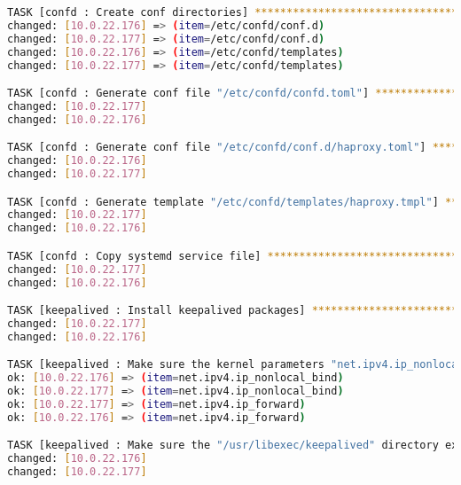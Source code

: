 \begin{flushleft}
\begin{lstlisting}[language=bash, caption=Deploy - Anhang - Deployt,captionpos=b,label={lst:deploy-appendix-deployt},breaklines=true]
TASK [confd : Create conf directories] ****************************************************************************************************************************************************************************
changed: [10.0.22.176] => (item=/etc/confd/conf.d)
changed: [10.0.22.177] => (item=/etc/confd/conf.d)
changed: [10.0.22.176] => (item=/etc/confd/templates)
changed: [10.0.22.177] => (item=/etc/confd/templates)

TASK [confd : Generate conf file "/etc/confd/confd.toml"] *********************************************************************************************************************************************************
changed: [10.0.22.177]
changed: [10.0.22.176]

TASK [confd : Generate conf file "/etc/confd/conf.d/haproxy.toml"] ************************************************************************************************************************************************
changed: [10.0.22.176]
changed: [10.0.22.177]

TASK [confd : Generate template "/etc/confd/templates/haproxy.tmpl"] **********************************************************************************************************************************************
changed: [10.0.22.177]
changed: [10.0.22.176]

TASK [confd : Copy systemd service file] **************************************************************************************************************************************************************************
changed: [10.0.22.177]
changed: [10.0.22.176]

TASK [keepalived : Install keepalived packages] *******************************************************************************************************************************************************************
changed: [10.0.22.177]
changed: [10.0.22.176]

TASK [keepalived : Make sure the kernel parameters "net.ipv4.ip_nonlocal_bind", "net.ipv4.ip_forward" are enabled] ************************************************************************************************
ok: [10.0.22.176] => (item=net.ipv4.ip_nonlocal_bind)
ok: [10.0.22.177] => (item=net.ipv4.ip_nonlocal_bind)
ok: [10.0.22.177] => (item=net.ipv4.ip_forward)
ok: [10.0.22.176] => (item=net.ipv4.ip_forward)

TASK [keepalived : Make sure the "/usr/libexec/keepalived" directory exists] **************************************************************************************************************************************
changed: [10.0.22.176]
changed: [10.0.22.177]


\end{lstlisting}
\end{flushleft}
